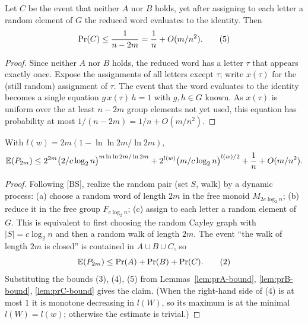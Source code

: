 \begin{lemma}
  \label{lem:prC-bound}
  Let $C$ be the event that neither $A$ nor $B$ holds, yet after assigning to
  each letter a random element of $G$ the reduced word evaluates to the identity.
  Then
  \[
    \operatorname{Pr}(C) \le \frac{1}{n - 2m} = \frac1n + O(m/n^2). \tag{5}
  \]
\end{lemma}
\begin{proof}
  Since neither $A$ nor $B$ holds, the reduced word has a letter $\tau$ that
  appears exactly once. Expose the assignments of all letters except $\tau$;
  write $x(\tau)$ for the (still random) assignment of $\tau$. The event that
  the word evaluates to the identity becomes a single equation
  $g\,x(\tau)\,h = 1$ with $g,h \in G$ known. As $x(\tau)$ is uniform over the at
  least $n - 2m$ group elements not yet used, this equation has probability at
  most $1/(n-2m) = 1/n + O(m/n^2)$.
\end{proof}

\begin{lemma}
  \label{lem:lemma1}
  With $l(w) = 2m(1 - \ln\ln 2m / \ln 2m)$,
  \[
    \mathbb{E}(P_{2m}) \le 2^{2m}\big(2/c\log_2 n\big)^{m\ln\ln 2m/\ln 2m}
      + 2^{l(w)}\big(m/c\log_2 n\big)^{l(w)/2}
      + \frac1n + O(m/n^2).
  \]
\end{lemma}
\begin{proof}
  Following [BS], realize the random pair (set $S$, walk) by a dynamic process:
  (a) choose a random word of length $2m$ in the free monoid $M_{2c\log_2 n}$;
  (b) reduce it in the free group $F_{c\log_2 n}$; (c) assign to each letter a
  random element of $G$. This is equivalent to first choosing the random Cayley
  graph with $|S| = c\log_2 n$ and then a random walk of length $2m$. The event
  ``the walk of length $2m$ is closed'' is contained in $A \cup B \cup C$, so
  \[
    \mathbb{E}(P_{2m}) \le \operatorname{Pr}(A) + \operatorname{Pr}(B) + \operatorname{Pr}(C). \tag{2}
  \]
  Substituting the bounds (3), (4), (5) from
  Lemmas~\ref{lem:prA-bound}, \ref{lem:prB-bound}, \ref{lem:prC-bound} gives the
  claim. (When the right-hand side of (4) is at most $1$ it is monotone
  decreasing in $l(W)$, so its maximum is at the minimal $l(W) = l(w)$;
  otherwise the estimate is trivial.)
\end{proof}

